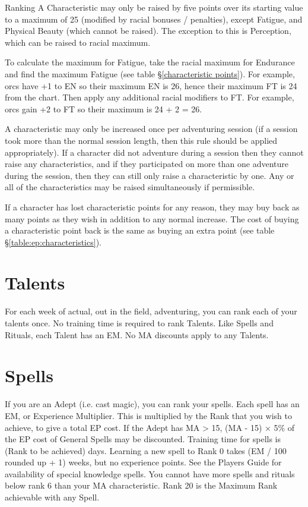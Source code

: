 \begin{Chapter}{Ranking}
A Characteristic may only be raised by five points over its starting
value to a maximum of 25 (modified by racial bonuses / penalties),
except Fatigue, and Physical Beauty (which cannot be raised). The
exception to this is Perception, which can be raised to racial
maximum.

To calculate the maximum for Fatigue, take the racial maximum for
Endurance and find the maximum Fatigue (see table
\S\ref{characteristic points}).  For example, orcs have +1 to EN so
their maximum EN is 26, hence their maximum FT is 24 from the
chart. Then apply any additional racial modifiers to FT. For example,
orcs gain +2 to FT so their maximum is 24 + 2 = 26.

A characteristic may only be increased once per adventuring session
(if a session took more than the normal session length, then this rule
should be applied appropriately). If a character did not adventure
during a session then they cannot raise any characteristics, and if
they participated on more than one adventure during the session, then
they can still only raise a characteristic by one.  Any or all of the
characteristics may be raised simultaneously if permissible.

If a character has lost characteristic points for any reason, they may
buy back as many points as they wish in addition to any normal
increase. The cost of buying a characteristic point back is the same
as buying an extra point (see table \S\ref{table:ep:characteristics}).

\section{Talents}

For each week of actual, out in the field, adventuring, you can rank
each of your talents once.  No training time is required to rank
Talents.  Like Spells and Rituals, each Talent has an EM. No MA
discounts apply to any Talents.

\section{Spells}

If you are an Adept (i.e. cast magic), you can rank your spells.  Each
spell has an EM, or Experience Multiplier. This is multiplied by the
Rank that you wish to achieve, to give a total EP cost.  If the Adept
has MA > 15, (MA - 15) × 5\% of the EP cost of General Spells may be
discounted. Training time for spells is (Rank to be achieved) days.
Learning a new spell to Rank 0 takes (EM / 100 rounded up + 1) weeks,
but no experience points.  See the Players Guide for availability of
special knowledge spells.  You cannot have more spells and rituals
below rank 6 than your MA characteristic. Rank 20 is the Maximum
Rank achievable with any Spell.


\end{Chapter}
